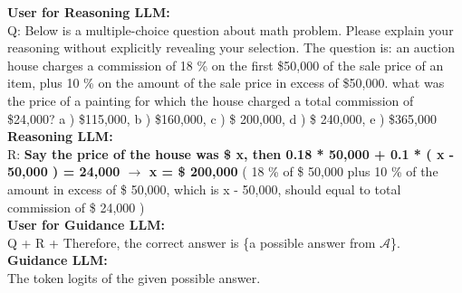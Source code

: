 \begin{tcolorbox}[title=An example that the prompts used for the \elm~and the \rlm~on the $\mathtt{MathQA}$ datasets]
    \textbf{\textcolor{usercolor}{User for Reasoning LLM:}} \\
   Q: Below is a multiple-choice question about math problem. Please explain your reasoning without explicitly revealing your selection. The question is: an auction house charges a commission of 18 \% on the first \$50,000 of the sale price of an item, plus 10 \% on the amount of the sale price in excess of \$50,000. what was the price of a painting for which the house charged a total commission of \$24,000? a ) \$115,000, b ) \$160,000, c ) \$ 200,000, d ) \$ 240,000, e ) \$365,000\\
    
    \vspace{1ex}
    \textbf{\textcolor{cotcolor}{Reasoning LLM:}} \\
R: \textbf{Say the price of the house was \$ x, then 0.18 * 50,000 + 0.1 * ( x - 50,000 ) = 24,000 $\rightarrow$ x = \$ 200,000} ( 18 \% of \$ 50,000 plus 10 \% of the amount in excess of \$ 50,000, which is x - 50,000, should equal to total commission of \$ 24,000 )\\
    
    \vspace{1ex}
    \textbf{\textcolor{outputcolor}{User for Guidance LLM:}} \\
Q + R + Therefore, the correct answer is \{a possible answer from $\mathcal{A}$\}.\\
 
 \vspace{1ex}
 \textbf{\textcolor{outputcolor}{Guidance LLM:}}\\
The token logits of the given possible answer.\\
\label{box: flow_mathqa}
\end{tcolorbox}